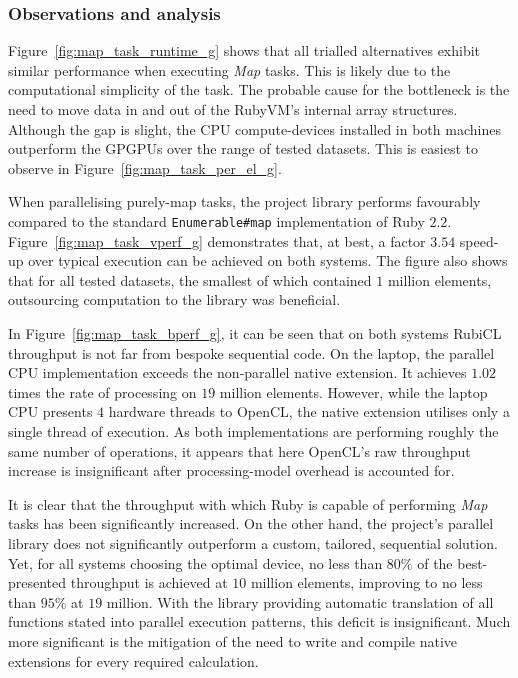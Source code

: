\subsubsection{Observations and analysis}
Figure~\ref{fig:map_task_runtime_g} shows that all trialled alternatives exhibit similar performance when executing \emph{Map} tasks.
This is likely due to the computational simplicity of the task. The probable cause for the bottleneck is the need to move data in and out of the RubyVM's internal array structures.
Although the gap is slight, the \ac{CPU} compute-devices installed in both machines outperform the \acp{GPGPU} over the range of tested datasets. This is easiest to observe in Figure~\ref{fig:map_task_per_el_g}.

When parallelising purely-map tasks, the project library performs favourably compared to the standard \verb|Enumerable#map| implementation of Ruby $2.2$. Figure~\ref{fig:map_task_vperf_g} demonstrates that, at best, a factor $3.5$\textendash$4$ speed-up over typical execution can be achieved on both systems.
The figure also shows that for all tested datasets, the smallest of which contained $1$ million elements, outsourcing computation to the library was beneficial.

In Figure~\ref{fig:map_task_bperf_g}, it can be seen that on both systems RubiCL throughput is not far from bespoke sequential code. On the laptop, the parallel \ac{CPU} implementation exceeds the non-parallel native extension. It achieves $1.02$ times the rate of processing on $19$ million elements.
However, while the laptop \ac{CPU} presents $4$ hardware threads to \ac{OpenCL}, the native extension utilises only a single thread of execution. As both implementations are performing roughly the same number of operations, it appears that here \ac{OpenCL}'s raw throughput increase is insignificant after processing-model overhead is accounted for.

It is clear that the throughput with which Ruby is capable of performing \emph{Map} tasks has been significantly increased.
On the other hand, the project's parallel library does not significantly outperform a custom, tailored, sequential solution.
Yet, for all systems choosing the optimal device, no less than $80\%$ of the best-presented throughput is achieved at $10$ million elements, improving to no less than $95\%$ at $19$ million.
With the library providing automatic translation of all functions stated into parallel execution patterns, this deficit is insignificant. Much more significant is the mitigation of the need to write and compile native extensions for every required calculation.


